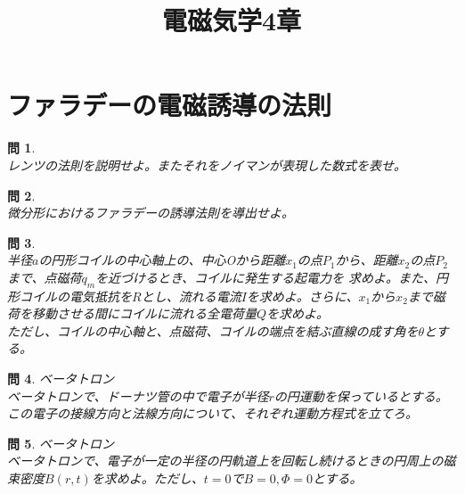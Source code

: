 \documentclass{jsarticle}
\title{電磁気学4章}
\author{}
\date{}
\newtheorem{pro}{問}[section]
\begin{document}
\maketitle
\noindent

\section{ファラデーの電磁誘導の法則}

\noindent
\begin{pro}~\\
    レンツの法則を説明せよ。またそれをノイマンが表現した数式を表せ。
\end{pro}

\begin{pro}~\\
    微分形におけるファラデーの誘導法則を導出せよ。
\end{pro}

\begin{pro}~\\
    半径\(a\)の円形コイルの中心軸上の、中心Oから距離\(x_{1}\)の点\(P_{1}\)から、距離\(x_{2}\)の点\(P_{2}\)まで、点磁荷\(q_{m}\)を近づけるとき、コイルに発生する起電力を
    求めよ。また、円形コイルの電気抵抗を\(R\)とし、流れる電流\(I\)を求めよ。さらに、\(x_{1}\)から\(x_{2}\)まで磁荷を移動させる間にコイルに流れる全電荷量\(Q\)を求めよ。\\
    ただし、コイルの中心軸と、点磁荷、コイルの端点を結ぶ直線の成す角を\(\theta\)とする。
\end{pro}

\begin{pro}ベータトロン\\
    ベータトロンで、ドーナツ管の中で電子が半径\(r\)の円運動を保っているとする。この電子の接線方向と法線方向について、それぞれ運動方程式を立てろ。
\end{pro}

\begin{pro}ベータトロン\\
    ベータトロンで、電子が一定の半径の円軌道上を回転し続けるときの円周上の磁束密度\(B(r,t)\)を求めよ。ただし、\(t=0\)で\(B=0,\Phi=0\)とする。
\end{pro}
\end{document}
